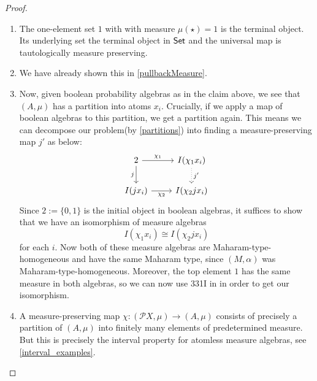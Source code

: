 \documentclass[a4paper]{amsproc}
\theoremstyle{plain}
\theoremstyle{definition}
\theoremstyle{remark}
\numberwithin{equation}{section}
\newcommand{\Set}{\textup{\textsf{Set}}}
\begin{document}
\begin{proof}
\begin{enumerate}
\item The one-element set $1$ with with measure $\mu(\star)=1$ is the terminal object. Its underlying set the terminal object in $\Set$ and the universal map is tautologically measure preserving.
\item We have already shown this in \ref{pullbackMeasure}.
\item
Now, given boolean probability algebras as in the claim above, we see that $(A, \mu)$ has a partition into atoms $x_i$. Crucially, if we apply a map of boolean algebras to this partition, we get a partition again. This means we can decompose our problem(by \ref{partitions}) into finding a measure-preserving map $j'$ as below:
\[
\begin{tikzcd}
2 \arrow[d, "j"'] \arrow[r, "\chi_1"]  & I(\chi_1 x_i) \arrow[d, "j'", dotted] \\
I(j x_i) \arrow[r, "\chi_2"'] & I(\chi_2 j x_i)
\end{tikzcd}
\]
Since $2 := \{0, 1\}$ is the initial object in boolean algebras, it suffices to show that we have an isomorphism of measure algebras
\[
I(\chi_1 x_i) \cong I(\chi_2 j x_i)
\]
for each $i$. Now both of these measure algebras are Maharam-type-homogeneous and have the same Maharam type, since $(M, \alpha)$ was Maharam-type-homogeneous. Moreover, the top element $1$ has the same measure in both algebras, so we can now use 331I in \cite{fremlin} in order to get our isomorphism.

\item A measure-preserving map $\chi:(\mathcal{P} X,\mu)\rightarrow (A,\mu)$ consists of precisely a partition of $(A,\mu)$ into finitely many elements of predetermined measure. But this is precisely the interval property for atomless measure algebras, see \ref{interval_examples}.

\end{enumerate}
\end{proof}
\end{document}
